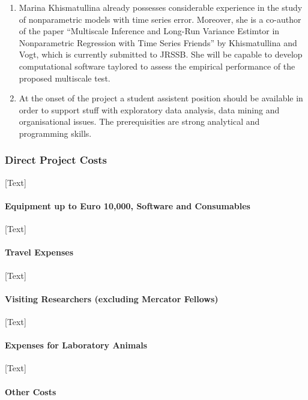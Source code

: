 \documentclass[a4paper,12pt]{article}
\begin{document}
\begin{enumerate}
	\item Marina Khismatullina already possesses considerable experience in the study of nonparametric models with time series error. Moreover, she is a co-author of the paper ``Multiscale Inference and Long-Run Variance Estimtor in Nonparametric Regression with Time Series Friends'' by Khismatullina and Vogt, which is currently submitted to JRSSB. She will be capable to develop computational software taylored to assess the empirical performance of the proposed multiscale test.
	\item At the onset of the project a student assistent position should be available in order to
support stuff with exploratory data analysis, data mining and organisational issues. The
prerequisities are strong analytical and programming skills.
\end{enumerate}

\subsubsection{Direct Project Costs}

[Text]

\paragraph{Equipment up to Euro 10,000, Software and Consumables}

[Text]

\paragraph{Travel Expenses}

[Text]

\paragraph{Visiting Researchers (excluding Mercator Fellows)}

[Text]

\paragraph{Expenses for Laboratory Animals}

[Text]

\paragraph{Other Costs}
\end{document}
